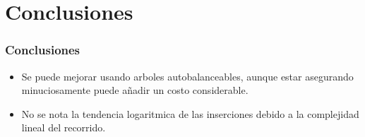 \documentclass{beamer}
\begin{document}
\section{Conclusiones}
	\begin{frame}
		\frametitle{Conclusiones}
			\begin{itemize}[<+->]
				\item Se puede mejorar usando arboles autobalanceables, aunque estar asegurando minuciosamente puede añadir un costo considerable.
				\item No se nota la tendencia logaritmica de las inserciones debido a la complejidad lineal del recorrido.
			\end{itemize}
	\end{frame}
\end{document}
